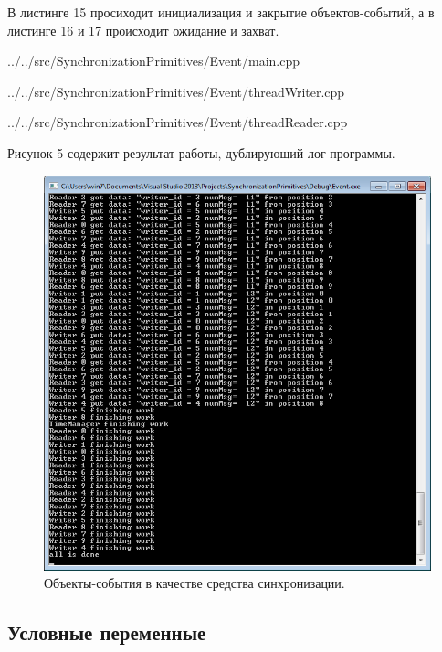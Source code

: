 \documentclass[a4paper, 12pt]{article}		%
\begin{document}
В листинге 15 просиходит инициализация и закрытие объектов-событий, а в листинге 16 и 17 происходит ожидание и захват.


{../../src/SynchronizationPrimitives/Event/main.cpp}


{../../src/SynchronizationPrimitives/Event/threadWriter.cpp}


{../../src/SynchronizationPrimitives/Event/threadReader.cpp}

Рисунок 5 содержит результат работы, дублирующий лог программы.

\begin{figure}[h!]
\centering
\includegraphics[scale=1]{res/004}
\caption{Объекты-события в качестве средства синхронизации.}
\end{figure}

\newpage
\subsection{Условные переменные}
\end{document}
